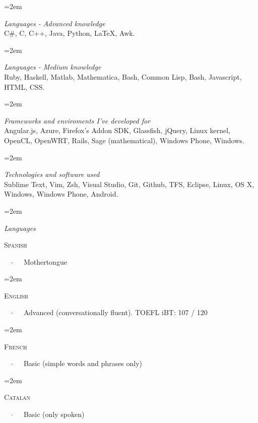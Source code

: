 \documentclass{scrartcl}
\newcommand{\Description}[1]{\hangindent=2em\hangafter=0\noindent\raggedright\footnotesize{#1}\par\normalsize\vspace{1em}} %
\newcommand{\header}[1]{{\small \textit{#1} \\ \vspace{0.2em}}}
\begin{document}
\begin{cv}{}

\vspace{1em}

\Description{\header{Languages - Advanced knowledge} C\#, C, C++, Java, Python, \LaTeX, Awk.}

\Description{\header{Languages - Medium knowledge} Ruby, Haskell, Matlab, Mathematica, Bash, Common Lisp, Bash, Javascript, HTML, CSS.}

\Description{\header{Frameworks and enviroments I've developed for}
Angular.js,
Azure,
Firefox's Addon SDK,
Glassfish,
jQuery,
Linux kernel,
OpenCL,
OpenWRT,
Rails,
Sage (mathematical),
Windows Phone,
Windows. }

\Description{\header{Technologies and software used} Sublime Text, Vim, Zsh, Visual Studio, Git, Github, TFS, Eclipse, Linux, OS X, Windows, Windows Phone, Android.}


\vspace{1em} %

\vspace{1em}

\newlength{\langbox} %
\settowidth{\langbox}{English} %

\Description{\header{Languages} \parbox{\langbox}{\textsc{Spanish}}\ \ $\cdotp$\ \ \ Mothertongue}

\vspace{-0.5em} %

\Description{\parbox{\langbox}{\textsc{English}}\ \ $\cdotp$\ \ \ Advanced (conversationally fluent). TOEFL iBT: 107 / 120}

\vspace{-0.5em} %

\Description{\parbox{\langbox}{\textsc{French}}\ \ $\cdotp$\ \ \ Basic (simple words and phrases only)}
\vspace{-0.5em} %

\Description{\parbox{\langbox}{\textsc{Catalan}}\ \ $\cdotp$\ \ \ Basic (only spoken)}

\vspace{1em} %


\end{cv}
\end{document}
